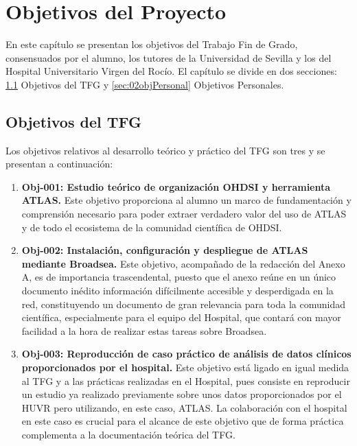 \chapter{Objetivos del Proyecto}\label{cap:02objetivos}

En este capítulo se presentan los objetivos del Trabajo Fin de Grado, consensuados por el alumno, los tutores de la Universidad de Sevilla y los del Hospital Universitario Virgen del Rocío. El capítulo se divide en dos secciones: \ref{sec:02objTFG} Objetivos del TFG y  \ref{sec:02objPersonal} Objetivos Personales.

\section{Objetivos del TFG} \label{sec:02objTFG}

Los objetivos relativos al desarrollo teórico y práctico del TFG son tres y se presentan a continuación:

%

\begin{enumerate}

    \item \textbf{Obj-001: Estudio teórico de organización OHDSI y herramienta ATLAS.} Este objetivo proporciona al alumno un marco de fundamentación y comprensión necesario para poder extraer verdadero valor del uso de ATLAS y de todo el ecosistema de la comunidad científica de OHDSI.

    \item \textbf{Obj-002: Instalación, configuración y despliegue de ATLAS mediante Broadsea.} Este objetivo, acompañado de la redacción del Anexo A, es de importancia trascendental, puesto que el anexo reúne en un único documento inédito información difícilmente accesible y desperdigada en la red, constituyendo un documento de gran relevancia para toda la comunidad científica, especialmente para el equipo del Hospital, que contará con mayor facilidad a la hora de realizar estas tareas sobre Broadsea.

    \item \textbf{Obj-003: Reproducción de caso práctico de análisis de datos clínicos proporcionados por el hospital.} Este objetivo está ligado en igual medida al TFG y a las prácticas realizadas en el Hospital, pues consiste en reproducir un estudio ya realizado previamente sobre unos datos proporcionados por el HUVR pero utilizando, en este caso, ATLAS. La colaboración con el hospital en este caso es crucial para el alcance de este objetivo que de forma práctica complementa a la documentación teórica del TFG.

\end{enumerate}

